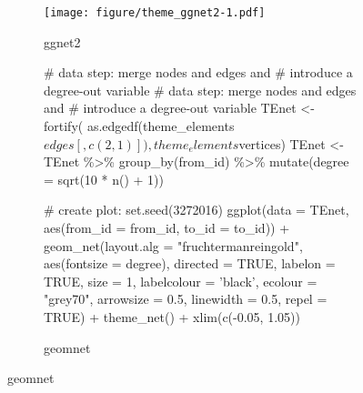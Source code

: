 \begin{figure}[hbtp]
\begin{subfigure}[t]{\textwidth}
\caption{ggnet2}


             \begin{adjustbox}{valign=t}

             \begin{minipage}{.49\textwidth}
{\footnotesize
{} 
}

                   \end{minipage}

                  \begin{minipage}{.49\textwidth}

\texttt{[image: figure/theme\_ggnet2-1.pdf]}

                          \end{minipage}

                          \end{adjustbox}
\end{subfigure}

\begin{subfigure}[t]{\textwidth}
\caption{geomnet}


             \begin{adjustbox}{valign=t}

             \begin{minipage}{.49\textwidth}
{\footnotesize
\begin{example}
# data step: merge nodes and edges and
# introduce a degree-out variable
# data step: merge nodes and edges and
# introduce a degree-out variable
TEnet <- fortify(
  as.edgedf(theme_elements$edges[,c(2,1)]),
            theme_elements$vertices)
TEnet <- TEnet \%>\%
  group_by(from_id) \%>\%
  mutate(degree = sqrt(10 * n() + 1))

# create plot:
set.seed(3272016)
ggplot(data = TEnet,
       aes(from_id = from_id, to_id = to_id)) +
  geom_net(layout.alg = "fruchtermanreingold",
    aes(fontsize = degree), directed = TRUE,
    labelon = TRUE, size = 1, labelcolour = 'black',
    ecolour = "grey70", arrowsize = 0.5,
    linewidth = 0.5, repel = TRUE) +
  theme_net() +
  xlim(c(-0.05, 1.05))
\end{example} 
}


\end{minipage}
\end{adjustbox}
\end{subfigure}
\end{figure}
